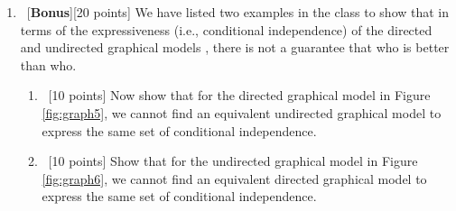 \documentclass[12pt, fullpage,letterpaper]{article}
\begin{document}
\begin{enumerate}
\item~[\textbf{Bonus}][20 points] We have listed two examples in the class to  show that in terms of the expressiveness (i.e., conditional independence) of the directed and undirected graphical models , there is not a guarantee that who is better than who. 
\begin{enumerate}
	\item~[10 points] Now show that for the directed graphical model in Figure \ref{fig:graph5}, we cannot find an equivalent undirected graphical model to express the same set of conditional independence.
	\item~[10 points] Show that for the undirected graphical model in Figure \ref{fig:graph6}, we cannot find an equivalent directed graphical model to express the same set of conditional independence. 
\end{enumerate}


\end{enumerate}
\end{document}
